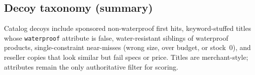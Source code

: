 \documentclass{article} %
\begin{document}
\subsection{Decoy taxonomy (summary)}
\label{app:decoys}

Catalog decoys include sponsored non-waterproof first hits, keyword-stuffed titles whose \texttt{waterproof} attribute is false, water-resistant siblings of waterproof products, single-constraint near-misses (wrong size, over budget, or stock~0), and reseller copies that look similar but fail specs or price. Titles are merchant-style; attributes remain the only authoritative filter for scoring.
\end{document}
